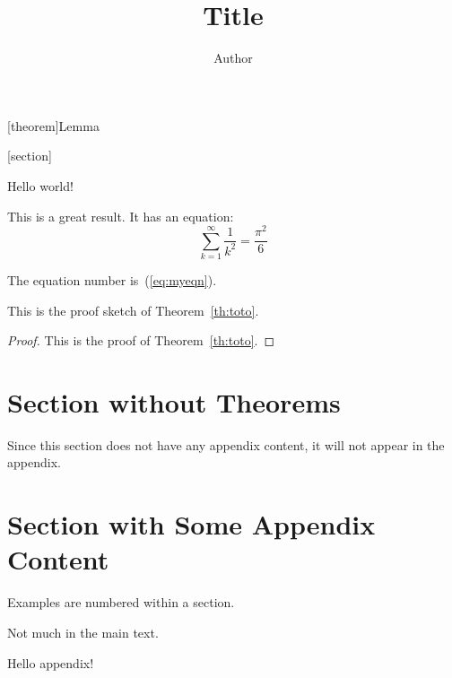 \usepackage{hyperref}

[theorem]{Lemma}

[section]

\renewcommand{\appendixsectionformat}[2]{Material for #2 (Section~#1)}
\renewcommand{\appendixrefname}{Appendix References}

\title{Title}
\author{Author}



\maketitle

Hello world!

\begin{theoremrep}
  \label{th:toto}
  This is a great result. It has an equation:
  \begin{equation}
    \label{eq:myeqn}
    \sum_{k=1}^\infty \frac1{k^2}=\frac{\pi^2}6
 \end{equation}
\end{theoremrep}

The equation number is~(\ref{eq:myeqn}).

\begin{proofsketch}
  This is the proof sketch of Theorem~\ref{th:toto}.
\end{proofsketch}

\begin{proof}
  This is the proof of Theorem~\ref{th:toto}.
\end{proof}

\section{Section without Theorems}

Since this section does not have any appendix content, it will not appear in the
appendix. \cite{brin1998anatomy}

\section{Section with Some Appendix Content}

\begin{example}
  Examples are numbered within a section.
\end{example}

Not much in the main text.

\begin{toappendix}
  Hello appendix!
\end{toappendix}

